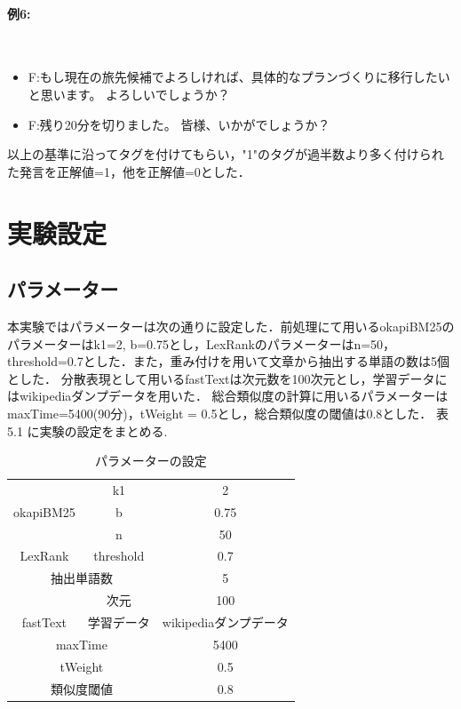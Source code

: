 \paragraph{例6:}\ \\
\begin{itemize}
\item F:もし現在の旅先候補でよろしければ、具体的なプランづくりに移行したいと思います。
 よろしいでしょうか？
\item F:残り20分を切りました。
 皆様、いかがでしょうか？
\end{itemize}
以上の基準に沿ってタグを付けてもらい，"1"のタグが過半数より多く付けられた発言を正解値=1，他を正解値=0とした．

\section{実験設定}
\label{exp:setting}
\subsection{パラメーター}
本実験ではパラメーターは次の通りに設定した．前処理にて用いるokapiBM25のパラメーターはk1=2, b=0.75とし，LexRankのパラメーターはn=50，threshold=0.7とした．また，重み付けを用いて文章から抽出する単語の数は5個とした．
分散表現として用いるfastTextは次元数を100次元とし，学習データにはwikipediaダンプデータを用いた．
総合類似度の計算に用いるパラメーターはmaxTime=5400(90分)，tWeight = 0.5とし，総合類似度の閾値は0.8とした．
表5.1 に実験の設定をまとめる.
\begin{table}[htbp]
\begin{center}
  \begin{tabular}{| c | c |  c |} \hline
      & k1 &  2 \\ \cline{2-3}
    okapiBM25 & b & 0.75 \\ \cline{2-3} \hline
     & n &  50 \\ \cline{2-3}
    LexRank & threshold & 0.7 \\ \cline{2-3} \hline
     \multicolumn{2}{|c|}{抽出単語数} & 5 \\  \hline
     & 次元 &  100 \\ \cline{2-3} 
    fastText & 学習データ & wikipediaダンプデータ \\ \cline{2-3} \hline
     \multicolumn{2}{|c|}{maxTime} & 5400 \\  \hline
     \multicolumn{2}{|c|}{tWeight} & 0.5 \\  \hline
     \multicolumn{2}{|c|}{類似度閾値} & 0.8 \\  \hline
  \end{tabular}
  \caption{パラメーターの設定}
  \label{table:par}
  \end{center}
\end{table}

